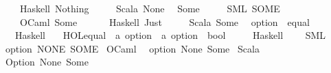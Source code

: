 \begin{isabellebody}
\ \ \ \ \ {\isacharparenleft}{\kern0pt}Haskell{\isacharparenright}{\kern0pt}\ {\isachardoublequoteopen}Nothing{\isachardoublequoteclose}\isanewline
\ \ \ \ \ {\isacharparenleft}{\kern0pt}Scala{\isacharparenright}{\kern0pt}\ {\isachardoublequoteopen}{\isacharbang}{\kern0pt}None{\isachardoublequoteclose}\isanewline
{\isacharbar}{\kern0pt}\ \ Some\ {\isasymrightharpoonup}\isanewline
\ \ \ \ {\isacharparenleft}{\kern0pt}SML{\isacharparenright}{\kern0pt}\ {\isachardoublequoteopen}SOME{\isachardoublequoteclose}\isanewline
\ \ \ \ \ {\isacharparenleft}{\kern0pt}OCaml{\isacharparenright}{\kern0pt}\ {\isachardoublequoteopen}Some\ {\isacharunderscore}{\kern0pt}{\isachardoublequoteclose}\isanewline
\ \ \ \ \ {\isacharparenleft}{\kern0pt}Haskell{\isacharparenright}{\kern0pt}\ {\isachardoublequoteopen}Just{\isachardoublequoteclose}\isanewline
\ \ \ \ \ {\isacharparenleft}{\kern0pt}Scala{\isacharparenright}{\kern0pt}\ {\isachardoublequoteopen}Some{\isachardoublequoteclose}\isanewline
{\isacharbar}{\kern0pt}\ \ option\ {\isacharcolon}{\kern0pt}{\isacharcolon}{\kern0pt}\ equal\ {\isasymrightharpoonup}\isanewline
\ \ \ \ {\isacharparenleft}{\kern0pt}Haskell{\isacharparenright}{\kern0pt}\ {\isacharminus}{\kern0pt}\isanewline
{\isacharbar}{\kern0pt}\ \ {\isachardoublequoteopen}HOL{\isachardot}{\kern0pt}equal\ {\isacharcolon}{\kern0pt}{\isacharcolon}{\kern0pt}\ {\isacharprime}{\kern0pt}a\ option\ {\isasymRightarrow}\ {\isacharprime}{\kern0pt}a\ option\ {\isasymRightarrow}\ bool{\isachardoublequoteclose}\ {\isasymrightharpoonup}\isanewline
\ \ \ \ {\isacharparenleft}{\kern0pt}Haskell{\isacharparenright}{\kern0pt}\ \ {}\ {\isachardoublequoteopen}{\isacharequal}{\kern0pt}{\isacharequal}{\kern0pt}{\isachardoublequoteclose}\isanewline
\isanewline
{}\isamarkupfalse%
\ SML\isanewline
\ \ option\ NONE\ SOME\isanewline
\isanewline
{}\isamarkupfalse%
\ OCaml\isanewline
\ \ option\ None\ Some\isanewline
\isanewline
{}\isamarkupfalse%
\ Scala\isanewline
\ \ Option\ None\ Some\isanewline
%
\isadelimtheory
\isanewline
%
\endisadelimtheory
%
\isatagtheory
{}\isamarkupfalse%
%
\endisatagtheory
{\isafoldtheory}%
%
\isadelimtheory
%
\endisadelimtheory
%
\end{isabellebody}%
\endinput
